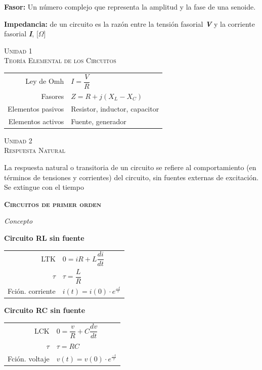 \documentclass[11pt,a4paper,twocolumn]{article}
\newcommand{\unidad}[2]{\begin{center}
		\fontsize{10}{10}\selectfont\color{gray!50!black}\scshape Unidad #1 \\
		\fontsize{14}{14}\selectfont \scshape #2
\end{center}}
\begin{document}
	\textbf{Fasor:} Un número complejo que representa la amplitud y la fase de una senoide.
	
	\textbf{Impedancia:} de un circuito es la razón entre la tensión fasorial \textbf{\textit{V}} y la corriente fasorial \textbf{\textit{I}}, [$\Omega$]
	\newpage
	
	\unidad{1}{Teoría Elemental de los Circuitos}
	
	\begin{tabular}{r | l}     \vspace{.2cm}
		Ley de Omh & $I=\dfrac{V}{R}$\\  \vspace{.2cm}
		Fasores & $Z=R+j(X_{L}-X_{C})$ \\  \vspace{.2cm}
		Elementos pasivos & Resistor, inductor, capacitor \\  \vspace{.2cm}
		Elementos activos & Fuente, generador\\
		
	\end{tabular}
	
	\unidad{2}{Respuesta Natural}

	La respuesta natural o transitoria de un circuito se refiere al comportamiento (en términos de tensiones y corrientes) del circuito, sin fuentes externas de excitación. Se extingue con el tiempo
	
	\begin{center}
		\large\textsc{\textbf{Circuitos de primer orden}}
	\end{center}
	
	\textsl{Concepto}
	
	\textbf{Circuito RL sin fuente} 
	\begin{center}
		\begin{tabular}{r | l} \vspace{.2cm} 
		LTK & $0=iR+L \dfrac{di}{dt}$ \\ \vspace{.2cm}
		$\tau$ & $\tau=\dfrac{L}{R}$ \\ \vspace{.2cm}
		Fción. corriente & $i(t)=i(0)\cdot e^{\frac{-t}{\tau}}$
	\end{tabular}
	\end{center}
	
	\textbf{Circuito RC sin fuente}
	\begin{center}
		\begin{tabular}{r | l} \vspace{.2cm} 
		LCK & $0=\dfrac{v}{R} + C \dfrac{dv}{dt}$ \\ \vspace{.2cm}
		$\tau$ & $\tau=RC$ \\ \vspace{.2cm}
		Fción. voltaje & $v(t)=v(0)\cdot e^{\frac{-t}{\tau}}$
	\end{tabular}
	\end{center}
\end{document}
